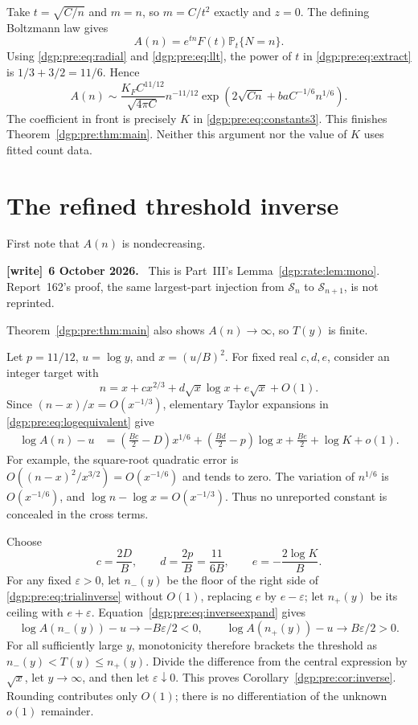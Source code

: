 \documentclass[11pt,letterpaper]{article}
\numberwithin{equation}{section}
\theoremstyle{remark}\newtheorem{remark}[theorem]{Remark}
\newcommand{\PP}{\mathbb P}
\newenvironment{writenote}[1][]{\par\smallskip\begingroup\small
 \noindent\textbf{[write]}\if\relax\detokenize{#1}\relax\else~\textbf{#1.}\fi\ }%
 {\par\endgroup\smallskip}
\begin{document}
Take $t=\sqrt{C/n}$ and $m=n$, so $m=C/t^2$ exactly and $z=0$.
The defining Boltzmann law gives
\begin{equation}
 A(n)=e^{tn}F(t)\PP_t\{N=n\}.
 \label{dgp:pre:eq:extract}
\end{equation}
Using \eqref{dgp:pre:eq:radial} and \eqref{dgp:pre:eq:llt}, the power of $t$ in
\eqref{dgp:pre:eq:extract} is $1/3+3/2=11/6$. Hence
\[
 A(n)\sim\frac{K_F C^{11/12}}{\sqrt{4\pi C}}
       n^{-11/12}
       \exp\left(2\sqrt{Cn}+baC^{-1/6}n^{1/6}\right).
\]
The coefficient in front is precisely $K$ in
\eqref{dgp:pre:eq:constants3}. This finishes Theorem~\ref{dgp:pre:thm:main}.
Neither this argument nor the value of $K$ uses fitted count data.

\section{The refined threshold inverse}\label{dgp:pre:sec:inverse}
First note that $A(n)$ is nondecreasing.
\begin{writenote}[6 October 2026]
This is Part~III's Lemma~\ref{dgp:rate:lem:mono}. Report~162's proof, the same largest-part injection from $\mathcal S_n$ to $\mathcal S_{n+1}$, is not reprinted.
\end{writenote}
Theorem~\ref{dgp:pre:thm:main} also shows $A(n)\to\infty$, so $T(y)$ is finite.

Let $p=11/12$, $u=\log y$, and $x=(u/B)^2$. For fixed real $c,d,e$,
consider an integer target with
\begin{equation}
 n=x+cx^{2/3}+d\sqrt x\log x+e\sqrt x+O(1).
 \label{dgp:pre:eq:trialinverse}
\end{equation}
Since $(n-x)/x=O(x^{-1/3})$, elementary Taylor expansions in
\eqref{dgp:pre:eq:logequivalent} give
\begin{align}
 \log A(n)-u
 &=\left(\frac{Bc}2-D\right)x^{1/6}
   +\left(\frac{Bd}2-p\right)\log x
   +\frac{Be}2+\log K+o(1).
 \label{dgp:pre:eq:inverseexpand}
\end{align}
For example, the square-root quadratic error is
$O((n-x)^2/x^{3/2})=O(x^{-1/6})$ and tends to zero.
The variation of $n^{1/6}$ is $O(x^{-1/6})$, and
$\log n-\log x=O(x^{-1/3})$.
Thus no unreported constant is concealed in the cross terms.

Choose
\begin{equation}
 c=\frac{2D}B,\qquad d=\frac{2p}B=\frac{11}{6B},\qquad
 e=-\frac{2\log K}B.
 \label{dgp:pre:eq:inversecoeffs}
\end{equation}
For any fixed $\varepsilon>0$, let $n_-(y)$ be the floor of the right
side of \eqref{dgp:pre:eq:trialinverse} without $O(1)$, replacing $e$ by
$e-\varepsilon$; let $n_+(y)$ be its ceiling with $e+\varepsilon$.
Equation~\eqref{dgp:pre:eq:inverseexpand} gives
\[
 \log A(n_-(y))-u\to-B\varepsilon/2<0,
 \qquad
 \log A(n_+(y))-u\to B\varepsilon/2>0.
\]
For all sufficiently large $y$, monotonicity therefore brackets the
threshold as $n_-(y)<T(y)\leq n_+(y)$.
Divide the difference from the central expression by $\sqrt x$,
let $y\to\infty$, and then let $\varepsilon\downarrow0$.
This proves Corollary~\ref{dgp:pre:cor:inverse}. Rounding contributes only $O(1)$;
there is no differentiation of the unknown $o(1)$ remainder.
\end{document}
